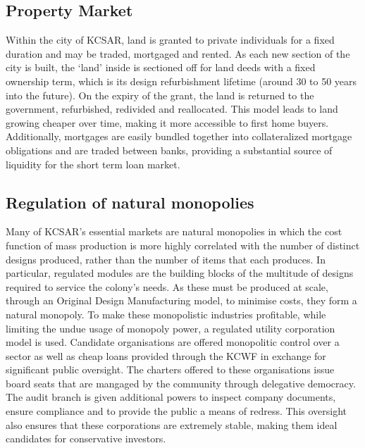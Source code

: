 \documentclass[fleqn,10pt]{Stylesheet} %
\begin{document}
\subsection{Property Market}
Within the city of KCSAR, land is granted to private individuals for a fixed duration and may be traded, mortgaged and rented. As each new section of the city is built, the ‘land’ inside is sectioned off for land deeds with a fixed ownership term, which is its design refurbishment lifetime (around 30 to 50 years into the future). On the expiry of the grant, the land is returned to the government, refurbished, redivided and reallocated. This model leads to land growing cheaper over time, making it more accessible to first home buyers. Additionally, mortgages are easily bundled together into collateralized mortgage obligations and are traded between banks, providing a substantial source of liquidity for the short term loan market.

\subsection{Regulation of natural monopolies}
Many of KCSAR's essential markets are natural monopolies in which the cost function of mass production is more highly correlated with the number of distinct designs produced, rather than the number of items that each produces. In particular, regulated modules are the building blocks of the multitude of designs required to service the colony's needs. As these must be produced at scale, through an Original Design Manufacturing model, to minimise costs, they form a natural monopoly. To make these monopolistic industries profitable, while limiting the undue usage of monopoly power, a regulated utility corporation model is used. Candidate organisations are offered monopolitic control over a sector as well as cheap loans provided through the KCWF in exchange for significant public oversight. The charters offered to these organisations issue board seats that are mangaged by the community through delegative democracy. The audit branch is given additional powers to inspect company documents, ensure compliance and to provide the public a means of redress. This oversight also ensures that these corporations are extremely stable, making them ideal candidates for conservative investors.
\end{document}
